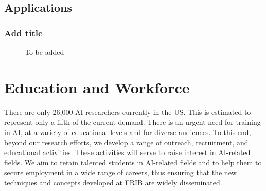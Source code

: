 \documentclass[%
10pt]{article}
\begin{document}
\clearpage
\newpage

\subsection{Applications}
\subsubsection{Add title}
\vspace{5mm}
\noindent
{}
\begin{figure}[htb!]
\centering
\caption{To be added}
\end{figure}
\clearpage
\newpage



\section{Education and Workforce}

There are only 26,000 AI researchers currently in the US. This is estimated to represent only a fifth of the current demand. There is an urgent need for training in AI, at a variety of educational levels and for diverse audiences. To this end, beyond our research efforts, we develop a range of outreach, recruitment, and educational activities. These activities will serve to raise interest in AI-related fields. We aim to retain talented students in AI-related fields and to help them to secure employment in a wide range of careers, thus ensuring that the new techniques and concepts developed at FRIB are widely disseminated.
\end{document}
